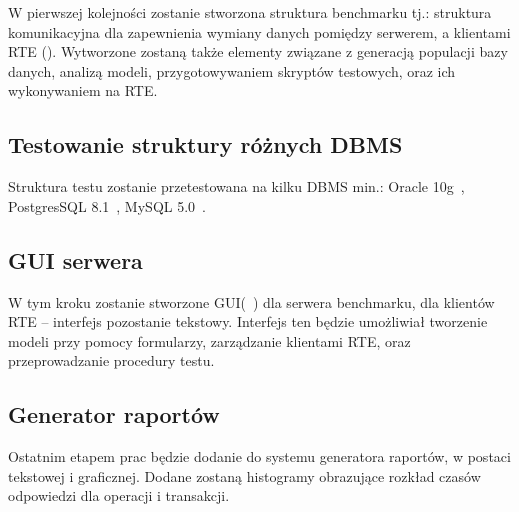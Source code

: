 W pierwszej kolejności zostanie stworzona struktura benchmarku tj.: struktura komunikacyjna
dla zapewnienia wymiany danych pomiędzy serwerem, a klientami RTE ().
Wytworzone zostaną także elementy związane z generacją populacji bazy danych, analizą modeli, przygotowywaniem skryptów testowych,
oraz ich wykonywaniem na RTE.

\subsection{Testowanie struktury różnych DBMS}

Struktura testu zostanie przetestowana na kilku DBMS min.: Oracle 10g~\cite{Oracle1}, PostgresSQL 8.1~\cite{PostgreSql1}, MySQL 5.0~\cite{MySql1}.

\subsection{GUI serwera}

W tym kroku zostanie stworzone GUI(~\cite{GUI}) dla serwera benchmarku,
dla klientów RTE -- interfejs pozostanie tekstowy. Interfejs ten będzie umożliwiał
tworzenie modeli przy pomocy formularzy, zarządzanie klientami RTE, oraz
przeprowadzanie procedury testu. 

\subsection{Generator raportów}

Ostatnim etapem prac będzie dodanie do systemu generatora raportów, w postaci tekstowej
i graficznej. Dodane zostaną histogramy obrazujące rozkład czasów odpowiedzi dla
operacji i transakcji.
